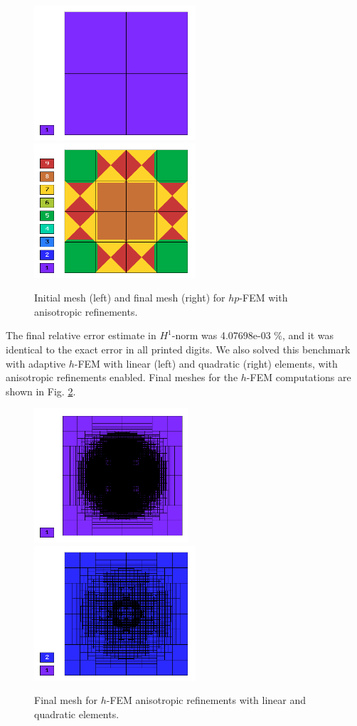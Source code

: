 \begin{figure}[!ht]
\centering
\includegraphics[height=5cm]{nist/nist-1/mesh_hp_aniso_init.png}\ \
\includegraphics[height=5cm]{nist/nist-1/mesh_hp_aniso.png}
\vspace{-2mm}
\caption{Initial mesh (left) and final mesh (right) for $hp$-FEM with anisotropic refinements.}
\label{fig:nist-1-hp-aniso}
\end{figure}

The final relative error estimate in $H^1$-norm was 4.07698e-03 \%, and it was identical to the exact error in all printed digits.
We also solved this benchmark with adaptive $h$-FEM
with linear (left) and quadratic (right)
elements, with anisotropic refinements enabled.
Final meshes for the $h$-FEM computations are shown
in Fig. \ref{fig:nist-1-h-aniso}.

\begin{figure}[!ht]
\centering
\includegraphics[height=5cm]{nist/nist-1/mesh_h1_aniso.png}\ \
\includegraphics[height=5cm]{nist/nist-1/mesh_h2_aniso.png}
\vspace{-2mm}
\caption{Final mesh for $h$-FEM anisotropic refinements with linear and quadratic elements.}
\label{fig:nist-1-h-aniso}
\end{figure}

